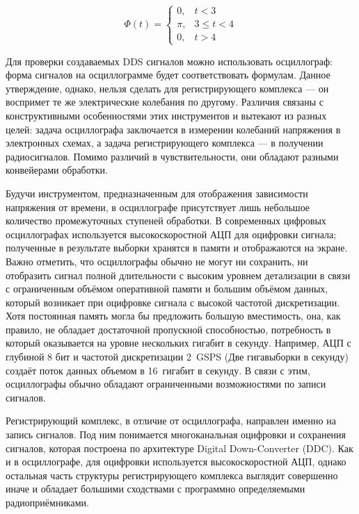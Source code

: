 \documentclass{report}
\begin{document}
$$
\Phi(t) =
\begin{cases}
0, & t < 3 \\
\pi, & 3 \le t < 4 \\
0, & t > 4
\end{cases}
$$

Для проверки создаваемых DDS сигналов можно использовать осциллограф: форма сигналов на осциллограмме будет соответствовать формулам. Данное утверждение, однако, нельзя сделать для регистрирующего комплекса --- он воспримет те же электрические колебания по другому. Различия связаны с конструктивными особенностями этих инструментов и вытекают из разных целей: задача осциллографа заключается в измерении колебаний напряжения в электронных схемах, а задача регистрирующего комплекса --- в получении радиосигналов. Помимо различий в чувствительности, они обладают разными конвейерами обработки.

Будучи инструментом, предназначенным для отображения зависимости напряжения от времени, в осциллографе присутствует лишь небольшое количество промежуточных ступеней обработки. В современных цифровых осциллографах используется высокоскоростной АЦП для оцифровки сигнала; полученные в результате выборки хранятся в памяти и отображаются на экране. Важно отметить, что осциллографы обычно не могут ни сохранить, ни отобразить сигнал полной длительности с высоким уровнем детализации в связи с ограниченным объёмом оперативной памяти и большим объёмом данных, который возникает при оцифровке сигнала с высокой частотой дискретизации. Хотя постоянная память могла бы предложить большую вместимость, она, как правило, не обладает достаточной пропускной способностью, потребность в который оказывается на уровне нескольких гигабит в секунду. Например, АЦП с глубиной 8 бит и частотой дискретизации 2~GSPS (Две гигавыборки в секунду) создаёт поток данных объемом в 16~гигабит в секунду. В связи с этим, осциллографы обычно обладают ограниченными возможностями по записи сигналов.

Регистрирующий комплекс, в отличие от осциллографа, направлен именно на запись сигналов. Под ним понимается многоканальная оцифровки и сохранения сигналов, которая построена по архитектуре Digital Down-Converter (DDC). Как и в осциллографе, для оцифровки используется высокоскоростной АЦП, однако остальная часть структуры регистрирующего комплекса выглядит совершенно иначе и обладает большими сходствами с программно определяемыми радиоприёмниками.
\end{document}
